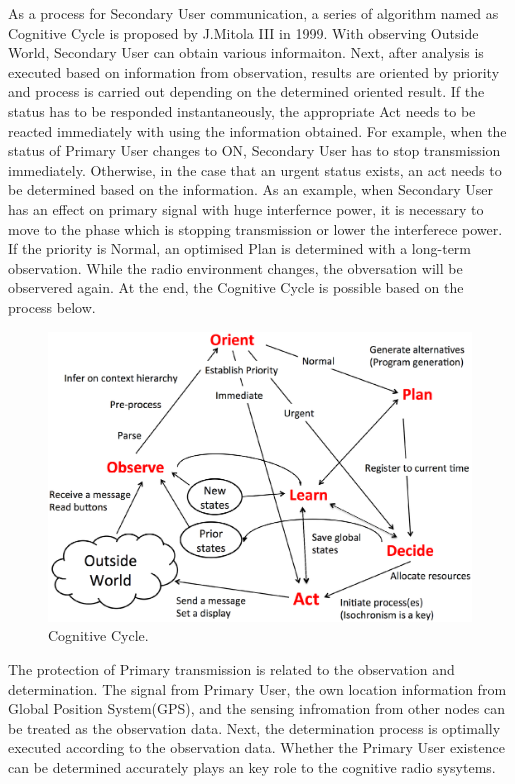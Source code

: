As a process for Secondary User communication, a series of algorithm named as Cognitive Cycle\cite{ref:mitola} is proposed by J.Mitola I\hspace{-.1em}I\hspace{-.1em}I in 1999. With observing Outside World, Secondary User can obtain various informaiton. Next, after analysis is executed based on information from observation, results are oriented by priority and process is carried out depending on the determined oriented result. If the status has to be responded instantaneously, the appropriate Act needs to be reacted immediately with using the information obtained. For example, when the status of Primary User changes to ON, Secondary User has to stop transmission immediately. Otherwise, in the case that an urgent status exists, an act needs to be determined based on the information. As an example, when Secondary User has an effect on primary signal with huge interfernce power, it is necessary to move to the phase which is stopping transmission or lower the interferece power. If the priority is Normal, an optimised Plan is determined with a long-term observation. While the radio environment changes, the obversation will be observered again. At the end, the Cognitive Cycle is possible based on the process below.
\begin{figure}[!htp]
\begin{center}
\includegraphics[width=120mm,clip]{cognitive_cycle.eps}
\caption{Cognitive Cycle.}
\label{fig:cognitive cycle}
\end{center}
\end{figure}

The protection of Primary transmission is related to the observation and determination. The signal from Primary User, the own location information from Global Position System(GPS), and the sensing infromation from other nodes can be treated as the observation data. Next, the determination process is optimally executed according to the observation data. Whether the Primary User existence can be determined accurately plays an key role to the cognitive radio sysytems.

